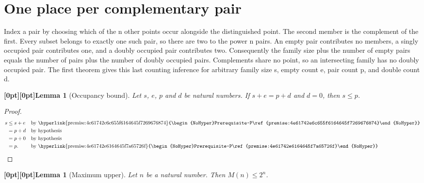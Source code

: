 \documentclass{article}
\makeatletter
\newcommand{\paperanchor}[1]{\hypertarget{#1}{}}%
\newcommand{\paperlink}[2]{\hyperlink{#1}{\begin{NoHyper}#2\end{NoHyper}}}%
\def\paperdest{\pdfextension dest}\def\paperstart{\pdfextension startlink}%
\def\paperend{\pdfextension endlink}\def\papercolor{\pdfextension colorstack}%
\let\paperdest\pdfdest\let\paperstart\pdfstartlink\let\paperend\pdfendlink\let\papercolor\pdfcolorstack
\newcommand{\paperanchor}[1]{\paperdest name{#1} xyz}%
\newcommand{\paperlink}[2]{\leavevmode\paperstart attr{/Border [0 0 0]} goto name{#1}%
      \papercolor 0 push {0.10 0.25 0.42 rg 0.10 0.25 0.42 RG}#2\papercolor 0 pop\paperend}%
\newcommand{\paperanchor}[1]{\special{pdf:dest (#1) [@thispage /XYZ null @ypos null]}}%
\newcommand{\paperlink}[2]{\leavevmode\special{pdf:bann << /Subtype /Link /Border [0 0 0] /A << /S /GoTo /D (#1) >> >>}%
      \special{color push rgb 0.10 0.25 0.42}#2\special{color pop}\special{pdf:eann}}%
\newcommand{\paperlineanchor}[1]{\raisebox{10pt}[0pt][0pt]{\paperanchor{#1}}}
\DeclareRobustCommand{\paperresultname}[1]{\paperlineanchor{theorem:\arabic{theorem}}#1}
\theoremstyle{paperresult}
\newcounter{paperpremise}
\newtheorem{lemma}[theorem]{\paperresultname{Lemma}}
\makeatother
\begin{document}

\section{One place per complementary pair}
Index a pair by choosing which of the n other points occur alongside the distinguished point. The second member is the complement of the first. Every subset belongs to exactly one such pair, so there are two to the power n pairs. An empty pair contributes no members, a singly occupied pair contributes one, and a doubly occupied pair contributes two. Consequently the family size plus the number of empty pairs equals the number of pairs plus the number of doubly occupied pairs. Complements share no point, so an intersecting family has no doubly occupied pair. The first theorem gives this last counting inference for arbitrary family size s, empty count e, pair count p, and double count d.

\begin{lemma}[{Occupancy bound}]\label{theorem:1}
Let \(s\), \(e\), \(p\) and \(d\) be natural numbers. If \(s + e = p + d\) and \(d = 0\), then \(s \le p\).
\end{lemma}

\begin{proof}
\begin{align*}
s &\le s + e && \text{by \paperlink{premise:4e61742e6c655f6164645f7269676874}{Prerequisite~P\ref{premise:4e61742e6c655f6164645f7269676874}}} \\
 &= p + d && \text{by hypothesis} \\
 &= p + 0 && \text{by hypothesis} \\
 &= p. && \text{by \paperlink{premise:4e61742e6164645f7a65726f}{Prerequisite~P\ref{premise:4e61742e6164645f7a65726f}}}
\end{align*}
\end{proof}

\begin{lemma}[{Maximum upper}]\label{theorem:2}
Let \(n\) be a natural number. Then \(M(n) \le 2^{n}\).
\end{lemma}
\end{document}
